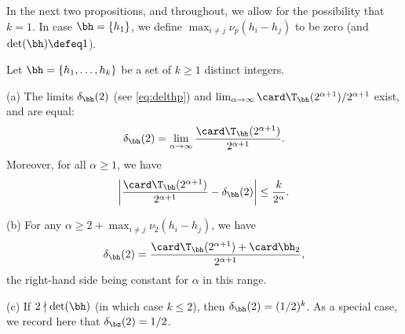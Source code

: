 \documentclass[12pt, reqno, twoside, letterpaper]{amsart}
\begin{document}
In the next two propositions, and throughout, we allow for the 
possibility that $k = 1$.
%
In case $\bh = \{h_1\}$, we define 
$\max_{i \ne j} \nu_p(h_i - h_j)$ to be zero (and 
$\det(\bh) \defeq 1$). 

\begin{proposition}
 \label{prop:S2h}
Let $\bh = \{h_1,\ldots,h_k\}$ be a set of $k \ge 1$ distinct 
integers.
%

\textup{(}a\textup{)}
%
The limits $\delta_{\bh}(2)$ 
\textup{(}see \eqref{eq:delthp}\textup{)} and 
$
 \lim_{\alpha \to \infty} 
  \card \T_{\bh}(2^{\alpha + 1})/2^{\alpha + 1}
$ exist, and are equal:
\begin{equation}
 \label{eq:defdelth2}
  \delta_{\bh}(2)
   =
    \lim_{\alpha \to \infty}
     \frac{\card \T_{\bh}(2^{\alpha + 1})}{2^{\alpha + 1}}.
\end{equation}
%
Moreover, for all $\alpha \ge 1$, we have  
\begin{equation}
 \label{eq:Thdelth2bnd}
  \bigg|
   \frac{\card \T_{\bh}(2^{\alpha + 1})}{2^{\alpha + 1}}
     -
      \delta_{\bh}(2)
  \bigg|
   \le 
    \frac{k}{2^{\alpha}}. 
\end{equation}
%

\textup{(}b\textup{)}
%
For any $\alpha \ge 2 + \max_{i \ne j} \nu_2(h_i - h_j)$, we have 
\begin{equation}
 \label{eq:delth2}
  \delta_{\bh}(2)
   =
    \frac{\card \T_{\bh}(2^{\alpha + 1}) + \card \bh_2}{2^{\alpha + 1}}, 
\end{equation}
the right-hand side being constant for $\alpha$ in this range.
%

\textup{(}c\textup{)}
%
If $2 \nmid \det(\bh)$ 
\textup{(}in which case $k \le 2$\textup{)}, then 
$\delta_{\bh}(2) = (1/2)^k$.
%
As a special case, we record here that $\delta_{\bz}(2) = 1/2$.
\end{proposition}
\end{document}

